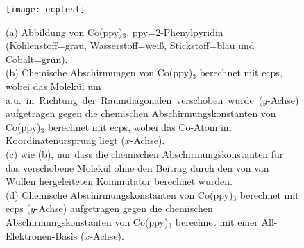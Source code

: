 \vfill
\newpage
\begin{figure}[ht!]
	\centering
	\texttt{[image: ecptest]}
	\captionsetup{figurewithin = chapter}
	\captionsetup{font=small, labelfont=bf}\caption[ECP-Testrechnungen an Co(ppy)$_3$]{\textsf{(a)} Abbildung von Co(ppy)$_3$, ppy=2-Phenylpyridin (Kohlenstoff=grau, Wasserstoff=weiß, Stickstoff=blau und Cobalt=grün).\\ \textsf{(b)} Chemische Abschirmungen von Co(ppy)$_3$  berechnet mit \acp{ecp}, wobei das Molekül um \unit[10]{a.u.} in Richtung der Raumdiagonalen verschoben wurde ($y$-Achse) aufgetragen gegen die chemischen Abschirmungskonstanten von Co(ppy)$_3$ berechnet mit \acp{ecp}, wobei das Co-Atom im Koordinatenursprung liegt ($x$-Achse).\\ \textsf{(c)} wie \textsf{(b)}, nur dass die chemischen Abschirmungskonstanten für das verschobene Molekül ohne den Beitrag durch den von van Wüllen hergeleiteten Kommutator berechnet wurden.\\ \textsf{(d)} Chemische Abschirmungskonstanten von Co(ppy)$_3$ berechnet mit \acp{ecp} ($y$-Achse) aufgetragen gegen die chemischen Abschirmungskonstanten von Co(ppy)$_3$ berechnet mit einer All-Elektronen-Basis ($x$-Achse).}
\label{abb:coppy3test}
\end{figure}
\vfill
\newpage

